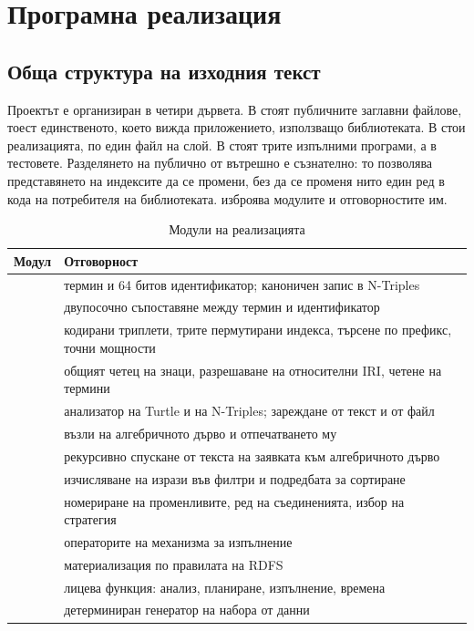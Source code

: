 \section{Програмна реализация}
\label{sec:implementation}

\subsection{Обща структура на изходния текст}

Проектът е организиран в четири дървета. В  стоят публичните
заглавни файлове, тоест единственото, което вижда приложението, използващо
библиотеката. В  стои реализацията, по един файл на слой. В 
стоят трите изпълними програми, а в  тестовете. Разделянето на публично
от вътрешно е съзнателно: то позволява представянето на индексите да се промени, без
да се променя нито един ред в кода на потребителя на библиотеката.
 изброява модулите и отговорностите им.

\begin{table}[H]
\caption{Модули на реализацията}
\label{tab:modules}
\centering
\fontsize{10}{12}\selectfont
\begin{tabular}{@{}L{3.4cm}L{9.4cm}@{}}
\toprule
\textbf{Модул} & \textbf{Отговорност} \\
\midrule
{}       & термин и 64 битов идентификатор; каноничен запис в N-Triples \\
 & двупосочно съпоставяне между термин и идентификатор \\
      & кодирани триплети, трите пермутирани индекса, търсене по префикс, точни мощности \\
      & общият четец на знаци, разрешаване на относителни IRI, четене на термини \\
     & анализатор на Turtle и на N-Triples; зареждане от текст и от файл \\
 & възли на алгебричното дърво и отпечатването му \\
 & рекурсивно спускане от текста на заявката към алгебричното дърво \\
 & изчисляване на изрази във филтри и подредбата за сортиране \\
    & номериране на променливите, ред на съединенията, избор на стратегия \\
       & операторите на механизма за изпълнение \\
       & материализация по правилата на RDFS \\
      & лицева функция: анализ, планиране, изпълнение, времена \\
  & детерминиран генератор на набора от данни \\
\bottomrule
\end{tabular}
\end{table}

